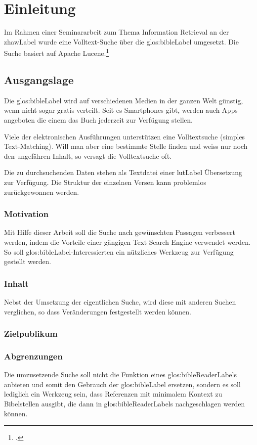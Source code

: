 \chapter{Einleitung}
Im Rahmen einer Seminararbeit zum Thema Information Retrieval an der \gls{zhawLabel} wurde eine Volltext-Suche über die \gls{glos:bibleLabel} umgesetzt. Die Suche basiert auf Apache Lucene.\footcite{Apache_Lucene_2016-05-07}

\section{Ausgangslage}
Die \gls{glos:bibleLabel} wird auf verschiedenen Medien in der ganzen Welt günstig, wenn nicht sogar gratis verteilt.
Seit es Smartphones gibt, werden auch Apps angeboten die einem das Buch jederzeit zur Verfügung stellen.

Viele der elektronischen Ausführungen unterstützen eine Volltextsuche (simples Text-Matching).
Will man aber eine bestimmte Stelle finden und weiss nur noch den ungefähren Inhalt, so versagt die Volltextsuche oft.

Die zu durchsuchenden Daten stehen als Textdatei einer \gls{lutLabel} Übersetzung zur Verfügung. Die Struktur der einzelnen Versen kann problemlos zurückgewonnen werden.

\subsection{Motivation}
Mit Hilfe dieser Arbeit soll die Suche nach gewünschten Passagen verbessert werden, indem die Vorteile einer gängigen Text Search Engine verwendet werden.
So soll \gls{glos:bibleLabel}-Interessierten ein nützliches Werkzeug zur Verfügung gestellt werden.

\subsection{Inhalt}
Nebst der Umsetzung der eigentlichen Suche, wird diese mit anderen Suchen verglichen, so dass Veränderungen festgestellt werden können.

\subsection{Zielpublikum}

\subsection{Abgrenzungen}
Die umzusetzende Suche soll nicht die Funktion eines \gls{glos:bibleReaderLabel}s anbieten und somit den Gebrauch der \gls{glos:bibleLabel} ersetzen, sondern es soll lediglich ein Werkzeug sein, dass Referenzen mit minimalem Kontext zu Bibelstellen ausgibt, die dann in \glspl{glos:bibleReaderLabel} nachgeschlagen werden können.


